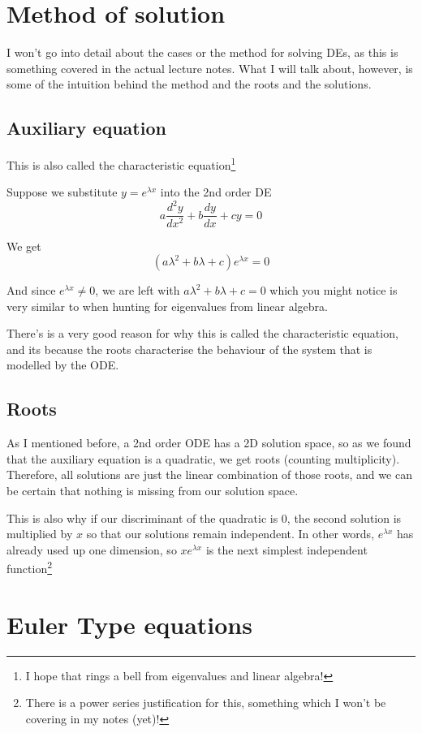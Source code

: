 \section{Method of solution} 

I won't go into detail about the cases or the method for solving DEs, as this is something  covered in the actual lecture notes. What I will talk about, however, is some of the intuition behind the method and the roots and the solutions. 

\subsection{Auxiliary equation}

This is also called the characteristic equation\footnote{I hope that rings a bell from eigenvalues and linear algebra!} 

Suppose we substitute $y = e^{\lambda x}$ into the 2nd order DE 
$$
a \frac{d^2y}{dx^2} + b \frac{dy}{dx} + cy = 0
$$

We get 
$$
(a\lambda^2 + b\lambda + c)e^{\lambda x} = 0
$$

And since $e^{\lambda x} \neq 0$, we are left with $a \lambda^2 + b\lambda + c = 0$ which you might notice is very similar to when hunting for eigenvalues from linear algebra. 

There's is a very good reason for why this is called the characteristic equation, and its because the roots characterise the behaviour of the system that is modelled by the ODE. 

\subsection{Roots} 

As I mentioned before, a 2nd order ODE has a 2D solution space, so as we found that the auxiliary equation is a quadratic, we get roots (counting multiplicity). Therefore, all solutions are just the linear combination of those roots, and we can be certain that nothing is missing from our solution space. 

This is also why if our discriminant of the quadratic is $0$, the second solution is multiplied by $x$ so that our solutions remain independent. In other words, $e^{\lambda x}$ has already used up one dimension, so $xe^{\lambda x}$ is the next simplest independent function\footnote{There is a power series justification for this, something which I won't be covering in my notes (yet)!}

\section{Euler Type equations}


